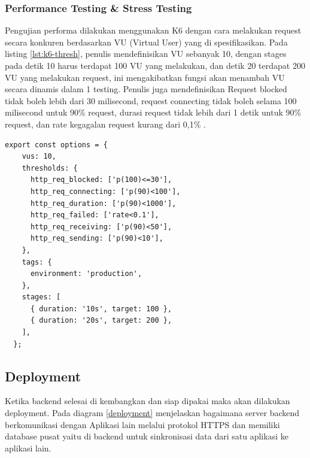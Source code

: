 \subsubsection{Performance Testing \& Stress Testing}
Pengujian performa dilakukan menggunakan K6 dengan cara melakukan request secara konkuren berdasarkan VU (Virtual User) yang di spesifikasikan. Pada listing \ref{lst:k6-thresh}, penulis mendefinisikan VU sebanyak 10, dengan stages pada detik 10 harus terdapat 100 VU yang melakukan, dan detik 20 terdapat 200 VU yang melakukan request, ini mengakibatkan fungsi akan menambah VU secara dinamis dalam 1 testing. Penulis juga mendefinisikan Request blocked tidak boleh lebih dari 30 milisecond, request connecting tidak boleh selama 100 milisecond untuk 90\% request, durasi request tidak lebih dari 1 detik untuk 90\% request, dan rate kegagalan request kurang dari 0,1\% \cite{nah2004study}.
\begin{lstlisting}[caption={Konfigurasi dan threshold yang perlu dicapai pada K6},label={lst:k6-thresh}]
  export const options = {
    vus: 10,
    thresholds: {
      http_req_blocked: ['p(100)<=30'],
      http_req_connecting: ['p(90)<100'],
      http_req_duration: ['p(90)<1000'],
      http_req_failed: ['rate<0.1'],
      http_req_receiving: ['p(90)<50'],
      http_req_sending: ['p(90)<10'],
    },
    tags: {
      environment: 'production',
    },
    stages: [
      { duration: '10s', target: 100 },
      { duration: '20s', target: 200 },
    ],
  };
\end{lstlisting}

\newpage

\subsection{Deployment}
Ketika backend selesai di kembangkan dan siap dipakai maka akan dilakukan deployment.
Pada diagram \ref{deployment} menjelaskan bagaimana server backend berkomunikasi dengan Aplikasi lain melalui protokol HTTPS dan memiliki database pusat yaitu di backend untuk sinkronisasi data dari satu aplikasi ke aplikasi lain. 

